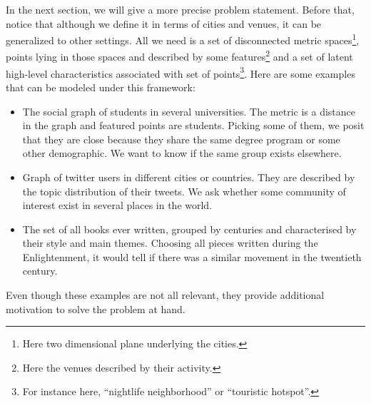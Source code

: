 In the next section, we will give a more precise problem statement. Before
that, notice that although we define it in terms of cities and venues, it can
be generalized to other settings. All we need is a set of disconnected metric
spaces\footnote{Here two dimensional plane underlying the cities.}, points
lying in those spaces and described by some features\footnote{Here the venues
described by their activity.} and a set of latent high-level characteristics
associated with set of points\footnote{For instance here, \enquote{nightlife
neighborhood} or \enquote{touristic hotspot}.}. Here are some examples that
can be modeled under this framework:
\begin{itemize}
	\item The social graph of students in several universities. The metric
		is a distance in the graph and featured points are students.
		Picking some of them, we posit that they are close because
		they share the same degree program or some other demographic.
		We want to know if the same group exists elsewhere.
	\item Graph of twitter users in different cities or countries. They
		are described by the topic distribution of their tweets. We
		ask whether some community of interest exist in several places
		in the world.
	\item The set of all books ever written, grouped by centuries and
		characterised by their style and main themes. Choosing all
		pieces written during the Enlightenment, it would tell if
		there was a similar movement in the twentieth century.
\end{itemize}
Even though these examples are not all relevant, they provide additional
motivation to solve the problem at hand.
